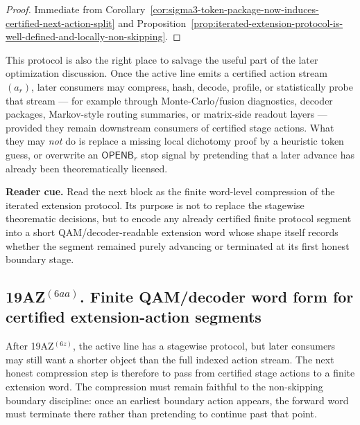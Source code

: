 \begin{proof}
Immediate from Corollary~\ref{cor:sigma3-token-package-now-induces-certified-next-action-split} and Proposition~\ref{prop:iterated-extension-protocol-is-well-defined-and-locally-non-skipping}.
\end{proof}

\begin{remark}
\label{rem:what-can-be-salvaged-from-later-optimization-ideas-without-corrupting-proof-line}
This protocol is also the right place to salvage the useful part of the later optimization discussion. Once the active line emits a certified action stream $(a_r)$, later consumers may compress, hash, decode, profile, or statistically probe that stream --- for example through Monte-Carlo/fusion diagnostics, decoder packages, Markov-style routing summaries, or matrix-side readout layers --- provided they remain downstream consumers of certified stage actions. What they may \emph{not} do is replace a missing local dichotomy proof by a heuristic token guess, or overwrite an $\mathsf{OPENB}_r$ stop signal by pretending that a later advance has already been theorematically licensed.
\end{remark}


\noindent\textbf{Reader cue.} Read the next block as the finite word-level compression of the iterated extension protocol. Its purpose is not to replace the stagewise theorematic decisions, but to encode any already certified finite protocol segment into a short QAM/decoder-readable extension word whose shape itself records whether the segment remained purely advancing or terminated at its first honest boundary stage.

\subsection*{19AZ$^{(6aa)}$. Finite QAM/decoder word form for certified extension-action segments}
\label{sec:finite-qam-decoder-word-form-for-certified-extension-action-segments}
After 19AZ$^{(6z)}$, the active line has a stagewise protocol, but later consumers may still want a shorter object than the full indexed action stream. The next honest compression step is therefore to pass from certified stage actions to a finite extension word. The compression must remain faithful to the non-skipping boundary discipline: once an earliest boundary action appears, the forward word must terminate there rather than pretending to continue past that point.

